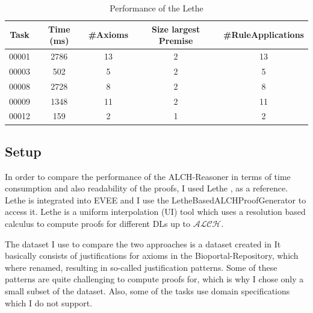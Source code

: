 \documentclass[titlepage]{article}
\begin{document}
\begin{table}[h]
  \centering
  \begin{tabular}{|c|c|c|c|c|}
    \hline
    \textbf{Task} & \textbf{Time (ms)} & \textbf{\#Axioms} & \textbf{Size largest Premise} & \textbf{\#RuleApplications} \\
    \hline
    \hline
    00001 & 2786 & 13 & 2 & 13 \\
    00003 & 502 & 5 & 2 & 5  \\
    00008 & 2728 & 8 & 2 & 8  \\
    00009 & 1348 & 11 & 2 & 11 \\
    00012 & 159 & 2 & 1 & 2  \\
    \hline
  \end{tabular}
  \caption{Performance of the Lethe}
    \label{tab:lethe-performance}
\end{table}

  
    
  
\subsection{Setup}
In order to compare the performance of the ALCH-Reasoner in terms of time consumption and also
readability of the proofs, I used Lethe \cite{KoopmannSchmidt15c}, as a reference.
Lethe is integrated into EVEE and I use the LetheBasedALCHProofGenerator to access it.
Lethe is a uniform interpolation (UI) tool which uses a resolution based calculus to compute
proofs for different DLs up to $\mathcal{ALCH}$.

The dataset I use to compare the two approaches is a dataset created in \cite{DBLP:conf/cade/AlrabbaaBBDKM22}
It basically consists of justifications for axioms in the Bioportal-Repository, which where renamed,
resulting in so-called justification patterns. Some of these patterns are quite challenging to 
compute proofs for, which is why I chose only a small subset of the dataset. Also, some of the tasks
use domain specifications which I do not support.
\end{document}
